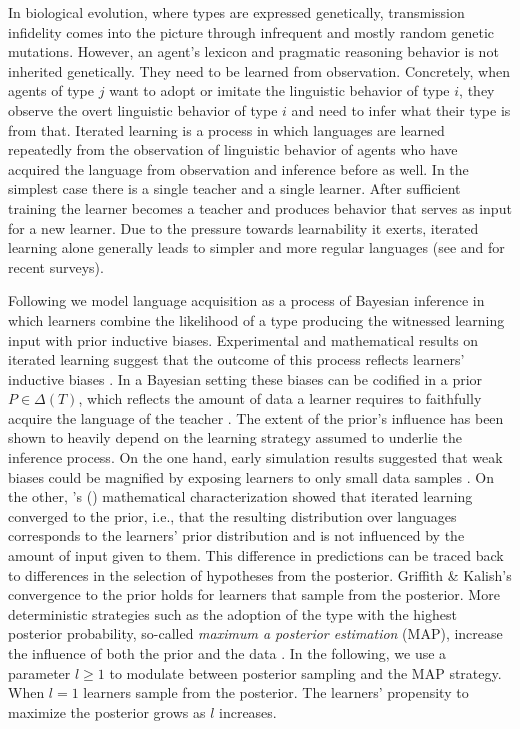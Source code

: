 \documentclass[a4paper, 11pt]{article}
\newcommand{\citeposs}[2][]{\citeauthor{#2}'s (\citeyear[#1]{#2})}
\begin{document}
In biological evolution, where types are expressed genetically, transmission infidelity comes
into the picture through infrequent and mostly random genetic mutations. However, an agent's lexicon
and pragmatic reasoning behavior is not inherited genetically. They need to be learned from
observation. Concretely, when agents of type $j$ want to adopt or imitate the linguistic
behavior of type $i$, they observe the overt linguistic behavior of type $i$ and need to infer what
their type is from that. Iterated learning is a process in which languages are learned repeatedly from the observation
of linguistic behavior of agents who have acquired the language from observation and inference
before as well. In the simplest case there is a single teacher and a single
learner. After sufficient training the learner becomes a teacher and produces behavior that
serves as input for a new learner. Due to the pressure towards learnability it exerts, iterated
learning alone generally leads to simpler and more regular languages (see \citealt{kirby+etal:2014}
and \citealt{tamariz+kirby:2016} for recent surveys). 

Following \citet{griffiths+kalish:2007} we model language acquisition as a process of Bayesian
inference in which learners combine the likelihood of a type producing the witnessed learning
input with prior inductive biases. Experimental and mathematical results on iterated learning
suggest that the outcome of this process reflects learners' inductive biases
\citep[e.g.,][]{kirby+etal:2014}. In a Bayesian setting these biases can be codified in a prior
$P \in \Delta(T)$, which reflects the amount of data a learner requires to faithfully acquire
the language of the teacher \citep[cf.][450]{griffiths+kalish:2007}. The extent of the prior's
influence has been shown to heavily depend on the learning strategy assumed to underlie the
inference process. On the one hand, early simulation results suggested that weak biases could
be magnified by exposing learners to only small data samples \citep[e.g. in][]{brighton:2002}. On the other, \citeposs{griffiths+kalish:2007} mathematical
characterization showed that iterated learning converged to the prior, i.e., that the resulting
distribution over languages corresponds to the learners' prior distribution and is not
influenced by the amount of input given to them. This difference in predictions can be traced
back to differences in the selection of hypotheses from the posterior. Griffith \& Kalish's
convergence to the prior holds for learners that sample from the posterior. More deterministic
strategies such as the adoption of the type with the highest posterior probability, so-called
{\it maximum a posterior estimation} (MAP), increase the influence of both the prior and the
data \citep{griffiths+kalish:2007,kirby+etal:2007}. In the following, we use a parameter
$l\ge1$ to modulate between posterior sampling and the MAP strategy. When $l = 1$ learners
sample from the posterior. The learners' propensity to maximize the posterior grows as $l$
increases.
\end{document}
